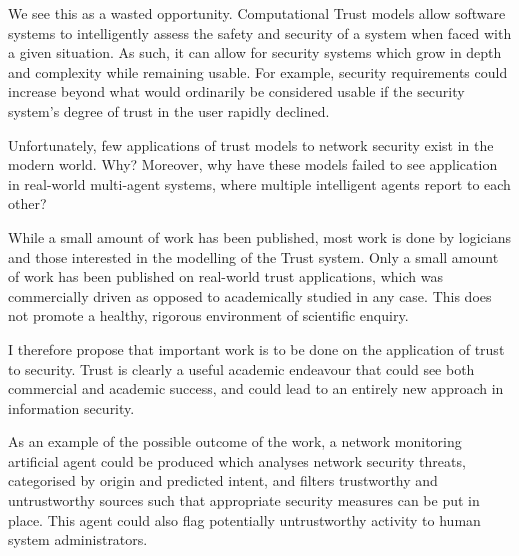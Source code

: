 \documentclass{tufte-handout}
\begin{document}
We see this as a wasted opportunity. Computational Trust models allow software systems to intelligently assess the safety and security of a system when faced with a given situation. As such, it can allow for security systems which grow in depth and complexity while remaining usable. For example, security requirements could increase beyond what would ordinarily be considered usable if the security system's degree of trust in the user rapidly declined. \par

\bigskip

Unfortunately, few applications of trust models to network security exist in the modern world. Why? Moreover, why have these models failed to see application in real-world multi-agent systems, where multiple intelligent agents report to each other?\par

While a small amount of work has been published, most work is done by logicians and those interested in the modelling of the Trust system. Only a small amount of work has been published on real-world trust applications, which was commercially driven as opposed to academically studied in any case\cite{Yan2003}. This does not promote a healthy, rigorous environment of scientific enquiry.\par

\bigskip

I therefore propose that important work is to be done on the application of trust to security. Trust is clearly a useful academic endeavour that could see both commercial and academic success, and could lead to an entirely new approach in information security.\par

As an example of the possible outcome of the work, a network monitoring artificial agent could be produced which analyses network security threats, categorised by origin and predicted intent, and filters trustworthy and untrustworthy sources such that appropriate security measures can be put in place. This agent could also flag potentially untrustworthy activity to human system administrators.\par
\end{document}
